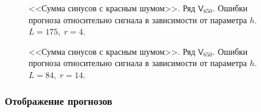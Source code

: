 \documentclass[specialist,
               substylefile = spbu.rtx,
               subf,href,colorlinks=true, 12p]{disser}
\begin{document}
\begin{figure}[H]
	\captionsetup{justification=centering}
	\caption{<<Сумма синусов с красным шумом>>. Ряд $\mathsf{V}_{650}$. Ошибки прогноза относительно сигнала в зависимости от параметра $h$. $L = 175, \; r = 4$.}
	\label{sigserr_r4.h}
\end{figure}

\begin{figure}[H]
	\captionsetup{justification=centering}
	\caption{<<Сумма синусов с красным шумом>>. Ряд $\mathsf{V}_{650}$. Ошибки прогноза относительно сигнала в зависимости от параметра $h$. $L = 84, \; r = 14$.}
	\label{sigserr_r14.h}
\end{figure}

\subsubsection{Отображение прогнозов}
\label{aserr_res}
\end{document}
